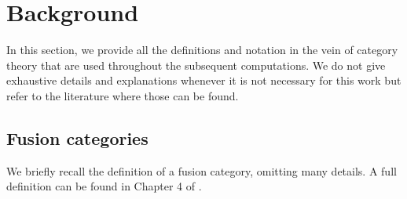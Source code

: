\documentclass[aps,prx,twocolumn,superscriptaddress,noshowkeys]{revtex4-2}  %
\theoremstyle{plain}%
\theoremstyle{definition}
\theoremstyle{remark}
\begin{document}
\section{Background}\label{S:defs}
In this section, we provide all the definitions and notation in the vein of category theory that are used throughout the subsequent computations. We do not give exhaustive details and explanations whenever it is not necessary for this work but refer to the literature where those can be found.

\subsection{Fusion categories}

We briefly recall the definition of a fusion category, omitting many details. A full definition can be found in Chapter 4 of \cite{Etingof2015}.
\end{document}
